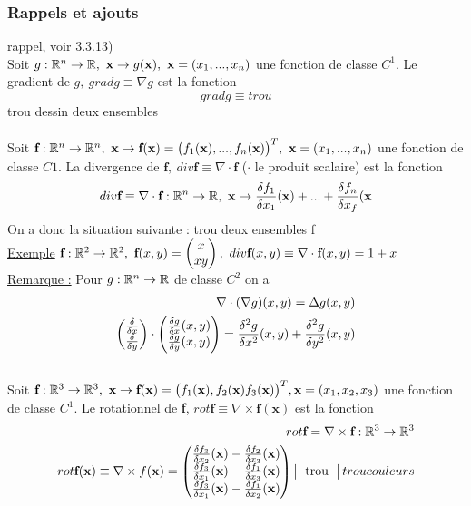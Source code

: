 \documentclass[12pt,a4paper]{article}
\begin{document}
\subsubsection{Rappels et ajouts}
 rappel, voir 3.3.13)\\
Soit $g : \mathbb{R}^n \to \mathbb{R},\ \textbf{x}\to g(\textbf{x}),\ \textbf{x} = (x_1,...,x_n)$ une fonction de classe $C^1$. Le gradient de $g,\ grad g \equiv \nabla g$ est la fonction 
\begin{equation*}
	grad g \equiv {trou}
\end{equation*}
{trou dessin deux ensembles}\\
\\
 Soit $\textbf{f} : \R^n \to \R^n,\ \textbf{x}\to \textbf{f}(\textbf{x}) = \big(f_1(\textbf{x}),...,f_n(\textbf{x})\big)^T,\ \textbf{x} = (x_1,...,x_n)$ une fonction de classe $C 1$. La divergence de $\textbf{f},\ div \textbf{f} \equiv \nabla \cdot \textbf{f}$ ($\cdot$ le produit scalaire) est la fonction 	
\begin{equation*}
	div \textbf{f} \equiv \nabla \cdot \textbf{f} : \mathbb{R}^n \to \mathbb{R},\ \textbf{x}\to \frac{\delta f_1}{\delta x_1}(\textbf{x}) + ... + \frac{\delta f_n}{\delta x_f}(\textbf{x}
\end{equation*}
On a donc la situation suivante :
{trou deux ensembles f}\\
\uline{Exemple} $\textbf{f} : \R^2 \to \R^2,\ \textbf{f}(x,y) = \combi{x}{xy},\ div \textbf{f}(x,y) \equiv \nabla \cdot \textbf{f} (x,y) = 1+x$\\
\uline{Remarque :} Pour $g : \mathbb{R}^n \to \mathbb{R}$ de classe $C^2$ on a 
\begin{align*}
	\nabla \cdot (\nabla g)(x,y) = \Delta g (x,y)\\
	\begin{pmatrix} \frac{\delta }{\delta x} \\ \frac{\delta }{\delta y} \end{pmatrix} \cdot \begin{pmatrix} \frac{\delta g}{\delta x}(x,y) \\ \frac{\delta g}{\delta y}(x,y) \end{pmatrix} = \frac{\delta^2 g}{\delta x^2}(x,y) + \frac{\delta^2 g}{\delta y^2}(x,y)
\end{align*}
\\
Soit $\textbf{f} : \mathbb{R}^3 \to \mathbb{R}^3,\ \textbf{x} \to \textbf{f}(\textbf{x}) = \big(f_1(\textbf{x}),f_2(\textbf{x})f_3(\textbf{x})\big)^T, \textbf{x} = (x_1,x_2,x_3)$ une fonction de classe $C^1$. Le rotationnel de \textbf{f}, $rot \textbf{f} \equiv \nabla \times \textbf{f}(\textbf{x})$ est la fonction 
\begin{align*}
	rot \textbf{f} = \nabla \times \textbf{f} : \R^3 \to \R^3\\
	rot \textbf{f}(\textbf{x}) \equiv \nabla \times f(\textbf{x}) = 
	\begin{pmatrix}
		\frac{\delta f_3}{\delta x_2}(\textbf{x}) - \frac{\delta f_2}{\delta x_3}(\textbf{x})\\
		\frac{\delta f_3}{\delta x_1}(\textbf{x}) - \frac{\delta f_1}{\delta x_3}(\textbf{x})\\
		\frac{\delta f_3}{\delta x_1}(\textbf{x}) - \frac{\delta f_1}{\delta x_2}(\textbf{x})
	\end{pmatrix} 
	\left|\begin{tabular}{ccc}
		{trou}
	\end{tabular}\right|	{trou couleurs}
\end{align*}
\end{document}
